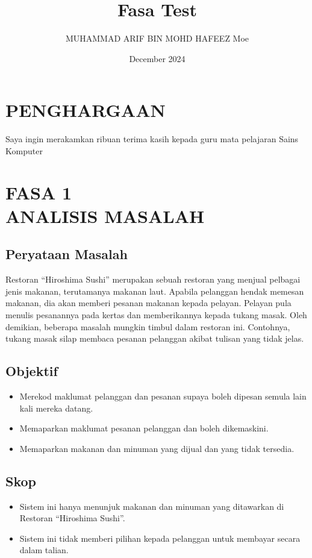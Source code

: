 \documentclass[a4paper, 12pt]{article}
\title{Fasa Test}
\author{MUHAMMAD ARIF BIN MOHD HAFEEZ Moe}
\date{December 2024}
\begin{document}
\section*{PENGHARGAAN}

\begin{center}
    Saya ingin merakamkan ribuan terima kasih kepada guru mata pelajaran Sains Komputer 
\end{center}

\newpage
\tableofcontents

\newpage
\section{FASA 1 \\[1em] ANALISIS MASALAH}

\subsection{Peryataan Masalah}

Restoran “Hiroshima Sushi” merupakan sebuah restoran yang menjual pelbagai jenis makanan, terutamanya makanan laut. Apabila pelanggan hendak memesan makanan, dia akan memberi pesanan makanan kepada pelayan. Pelayan pula menulis pesanannya pada kertas dan memberikannya kepada tukang masak. Oleh demikian, beberapa masalah mungkin timbul dalam restoran ini. Contohnya, tukang masak silap membaca pesanan pelanggan akibat tulisan yang tidak jelas.

\subsection{Objektif}

\begin{itemize}
    \item Merekod maklumat pelanggan dan pesanan supaya boleh dipesan semula lain kali mereka datang.
    \item Memaparkan maklumat pesanan pelanggan dan boleh dikemaskini.
    \item Memaparkan makanan dan minuman yang dijual dan yang tidak tersedia.
\end{itemize}

\subsection{Skop}

\begin{itemize}
    \item Sistem ini hanya menunjuk makanan dan minuman yang ditawarkan di Restoran “Hiroshima Sushi”.
    \item Sistem ini tidak memberi pilihan kepada pelanggan untuk membayar secara dalam talian.
\end{itemize}
\end{document}

